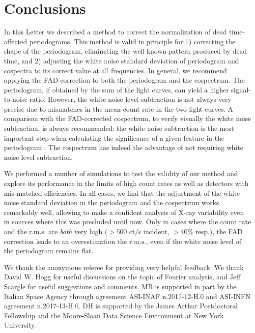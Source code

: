 \documentclass[twocolumn]{aastex61}
\newcommand{\rms}{\ensuremath{\mathrm{r.m.s.}}\xspace}
\begin{document}
\section{Conclusions}
In this Letter we described a method to correct the normalization of dead time-affected periodograms.
This method is valid in principle for 
1) correcting the shape of the periodogram, eliminating the well known pattern produced by dead time, and 
2) adjusting the white noise standard deviation of periodogram and cospectra to its correct value at all frequencies.
In general, we recommend applying the FAD correction to both the periodogram and the cospectrum. 
The periodogram, if obtained by the sum of the light curves, can yield a higher signal-to-noise ratio.
However, the white noise level subtraction is not always very precise due to mismatches in the mean count rate in the two light curves. 
A comparison with the FAD-corrected cospectrum, to verify visually the white noise subtraction, is always recommended: the white noise subtraction is the most important step when calculating the significance of a given feature in the periodogram \citep[e.g.][]{Barret+12,Huppenkothen+17}.
The cospectrum has indeed the advantage of not requiring white noise level subtraction.

We performed a number of simulations to test the validity of our method and explore its performance in the limits of high count rates as well as detectors with mis-matched efficiencies. 
In all cases, we find that the adjustment of the white noise standard deviation in the periodogram and the cospectrum works remarkably well, allowing to make a confident analysis of X-ray variability even in sources where this was precluded until now.
Only in cases where the count rate and the \rms are \textit{both} very high ($>$500 ct/s incident, $>$40\% resp.), the FAD correction leads to an overestimation the \rms, even if the white noise level of the periodogram remains flat.

\acknowledgments
We thank the anonymous referee for providing very helpful feedback.
We thank David W. Hogg for useful discussions on the topic of Fourier analysis, and Jeff Scargle for useful suggestions and comments.
MB is supported in part by the Italian Space Agency through agreement ASI-INAF n.2017-12-H.0 and ASI-INFN agreement n.2017-13-H.0.
DH is supported by the James Arthur Postdoctoral Fellowship and the Moore-Sloan Data Science Environment at New York University.
\end{document}
